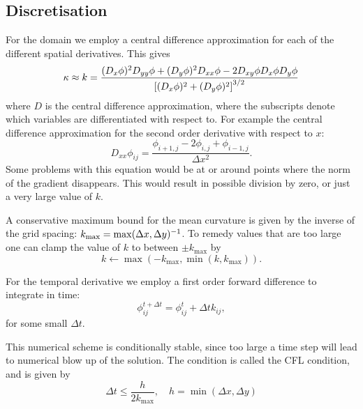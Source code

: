 \documentclass[sigconf]{acmart}
\begin{document}
\subsection{Discretisation}
For the domain we employ a central difference approximation for each of the different spatial derivatives. This gives
\begin{equation}\label{key}
	\kappa \approx k = \frac{(D_x \phi)^2 D_{yy}\phi + (D_y \phi)^2 D_{xx}\phi - 2D_{xy}\phi D_x \phi D_y \phi}{\left[ (D_x\phi)^2 + (D_y\phi)^2 \right]^{3/2}}
\end{equation}
where $ D $  is the central difference approximation, where the subscripts denote which variables are differentiated with respect to. For example the central difference approximation for the second order derivative with respect to $ x $:
\begin{equation}\label{key}
	D_{xx} \phi_{ij} = \frac{\phi_{i+1, j} - 2\phi_{i,j} + \phi_{i-1,j}}{\Delta x^2}.
\end{equation}
Some problems with this equation would be at or around points where the norm of the gradient disappears. This would result in possible division by zero, or just a very large value of $ k $.

A conservative maximum bound for the mean curvature is given by the inverse of the grid spacing: $ k_{\max} = \max(\Delta x, \Delta y)^{-1} $. To remedy values that are too large one can clamp the value of $ k $ to between $ \pm k_{\max} $ by
\begin{equation}\label{key}
	k\leftarrow \max(-k_{\max}, \min(k, k_{\max})).
\end{equation}

For the temporal derivative we employ a first order forward difference to integrate in time:
\begin{equation}\label{key}
	\phi_{ij}^{t+\Delta t} = \phi_{ij}^t + \Delta t k_{ij}, 
\end{equation}
for some small $ \Delta t $.

This numerical scheme is conditionally stable, since too large a time step will lead to numerical blow up of the solution. The condition is called the CFL condition, and is given by
\begin{equation}\label{key}
	\Delta t \leq \frac{h}{2k_{\max}}, \quad h = \min(\Delta x, \Delta y)
\end{equation}
\end{document}
